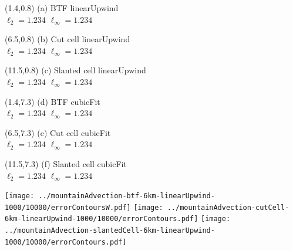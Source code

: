 \documentclass{article}
\begin{document}
\TPMargin{1pt}
\begin{textblock}{4}(1.4,0.8)
\normalsize
(a) BTF linearUpwind \\
\hspace*{1em}$\ell_2 = \num{1.234}$
\hspace*{1em}$\ell_\infty = \num{1.234}$
\end{textblock}
\begin{textblock}{4}(6.5,0.8)
\normalsize
(b) Cut cell linearUpwind \\
\hspace*{1em}$\ell_2 = \num{1.234}$
\hspace*{1em}$\ell_\infty = \num{1.234}$
\end{textblock}
\begin{textblock}{4}(11.5,0.8)
\normalsize
(c) Slanted cell linearUpwind \\
\hspace*{1em}$\ell_2 = \num{1.234}$
\hspace*{1em}$\ell_\infty = \num{1.234}$
\end{textblock}
\begin{textblock}{4}(1.4,7.3)
\normalsize
(d) BTF cubicFit \\
\hspace*{1em}$\ell_2 = \num{1.234}$
\hspace*{1em}$\ell_\infty = \num{1.234}$
\end{textblock}
\begin{textblock}{4}(6.5,7.3)
\normalsize
(e) Cut cell cubicFit \\
\hspace*{1em}$\ell_2 = \num{1.234}$
\hspace*{1em}$\ell_\infty = \num{1.234}$
\end{textblock}
\begin{textblock}{4}(11.5,7.3)
\normalsize
(f) Slanted cell cubicFit \\
\hspace*{1em}$\ell_2 = \num{1.234}$
\hspace*{1em}$\ell_\infty = \num{1.234}$
\end{textblock}
\texttt{[image: ../mountainAdvection-btf-6km-linearUpwind-1000/10000/errorContoursW.pdf]}
\hspace*{0.35em}
\texttt{[image: ../mountainAdvection-cutCell-6km-linearUpwind-1000/10000/errorContours.pdf]}
\hspace*{0.35em}
\texttt{[image: ../mountainAdvection-slantedCell-6km-linearUpwind-1000/10000/errorContours.pdf]} \\
\end{document}
